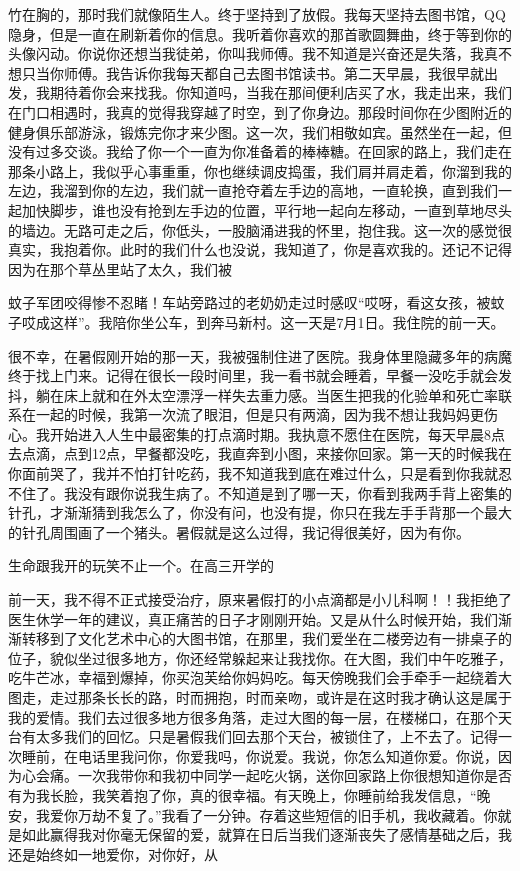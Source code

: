 \documentclass{article}
\begin{document}
\newpage 

竹在胸的，那时我们就像陌生人。终于坚持到了放假。我每天坚持去图书馆，QQ隐身，但是一直在刷新着你的信息。我听着你喜欢的那首歌圆舞曲，终于等到你的头像闪动。你说你还想当我徒弟，你叫我师傅。我不知道是兴奋还是失落，我真不想只当你师傅。我告诉你我每天都自己去图书馆读书。第二天早晨，我很早就出发，我期待着你会来找我。你知道吗，当我在那间便利店买了水，我走出来，我们在门口相遇时，我真的觉得我穿越了时空，到了你身边。那段时间你在少图附近的健身俱乐部游泳，锻炼完你才来少图。这一次，我们相敬如宾。虽然坐在一起，但没有过多交谈。我给了你一个一直为你准备着的棒棒糖。在回家的路上，我们走在那条小路上，我似乎心事重重，你也继续调皮捣蛋，我们肩并肩走着，你溜到我的左边，我溜到你的左边，我们就一直抢夺着左手边的高地，一直轮换，直到我们一起加快脚步，谁也没有抢到左手边的位置，平行地一起向左移动，一直到草地尽头的墙边。无路可走之后，你低头，一股脑涌进我的怀里，抱住我。这一次的感觉很真实，我抱着你。此时的我们什么也没说，我知道了，你是喜欢我的。还记不记得因为在那个草丛里站了太久，我们被

\newpage 

蚊子军团咬得惨不忍睹！车站旁路过的老奶奶走过时感叹“哎呀，看这女孩，被蚊子哎成这样”。我陪你坐公车，到奔马新村。这一天是7月1日。我住院的前一天。

很不幸，在暑假刚开始的那一天，我被强制住进了医院。我身体里隐藏多年的病魔终于找上门来。记得在很长一段时间里，我一看书就会睡着，早餐一没吃手就会发抖，躺在床上就和在外太空漂浮一样失去重力感。当医生把我的化验单和死亡率联系在一起的时候，我第一次流了眼泪，但是只有两滴，因为我不想让我妈妈更伤心。我开始进入人生中最密集的打点滴时期。我执意不愿住在医院，每天早晨8点去点滴，点到12点，早餐都没吃，我直奔到小图，来接你回家。第一天的时候我在你面前哭了，我并不怕打针吃药，我不知道我到底在难过什么，只是看到你我就忍不住了。我没有跟你说我生病了。不知道是到了哪一天，你看到我两手背上密集的针孔，才渐渐猜到我怎么了，你没有问，也没有提，你只在我左手手背那一个最大的针孔周围画了一个猪头。暑假就是这么过得，我记得很美好，因为有你。

生命跟我开的玩笑不止一个。在高三开学的

\newpage 

前一天，我不得不正式接受治疗，原来暑假打的小点滴都是小儿科啊！！我拒绝了医生休学一年的建议，真正痛苦的日子才刚刚开始。又是从什么时候开始，我们渐渐转移到了文化艺术中心的大图书馆，在那里，我们爱坐在二楼旁边有一排桌子的位子，貌似坐过很多地方，你还经常躲起来让我找你。在大图，我们中午吃雅子，吃牛芒冰，幸福到爆掉，你买泡芙给你妈妈吃。每天傍晚我们会手牵手一起绕着大图走，走过那条长长的路，时而拥抱，时而亲吻，或许是在这时我才确认这是属于我的爱情。我们去过很多地方很多角落，走过大图的每一层，在楼梯口，在那个天台有太多我们的回忆。只是暑假我们回去那个天台，被锁住了，上不去了。记得一次睡前，在电话里我问你，你爱我吗，你说爱。我说，你怎么知道你爱。你说，因为心会痛。一次我带你和我初中同学一起吃火锅，送你回家路上你很想知道你是否有为我长脸，我笑着抱了你，真的很幸福。有天晚上，你睡前给我发信息，“晚安，我爱你万劫不复了。”我看了一分钟。存着这些短信的旧手机，我收藏着。你就是如此赢得我对你毫无保留的爱，就算在日后当我们逐渐丧失了感情基础之后，我还是始终如一地爱你，对你好，从
\end{document}
